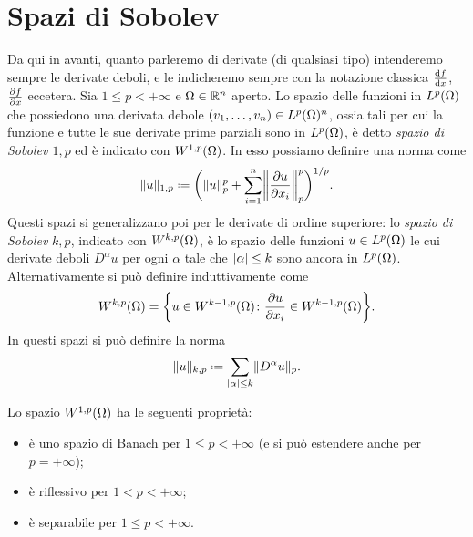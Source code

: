 \section{Spazi di Sobolev}
Da qui in avanti, quanto parleremo di derivate (di qualsiasi tipo) intenderemo sempre le derivate deboli, e le indicheremo sempre con la notazione classica $\drv{f}{x}$, $\drp{f}{x}$ eccetera.
Sia $1\le p<+\infty$ e $\Omega\in\R^n$ aperto.
Lo spazio delle funzioni in $\leb[p]{\Omega}$ che possiedono una derivata debole $(v_1,\dotsc,v_n)\in\leb[p]{\Omega}^n$, ossia tali per cui la funzione e tutte le sue derivate prime parziali sono in $\leb[p]{\Omega}$, è detto \emph{spazio di Sobolev $1,p$} ed è indicato con $\sobW[1,p]{\Omega}$.
In esso possiamo definire una norma come
\begin{equation}
    \norm{u}_{1,p}\defeq\biggl(\norm{u}_p^p+\sum_{i=1}^n\norm[\bigg]{\drp{u}{x_i}}_p^p\biggr)^{1/p}.
    \label{eq:norma-W1p}
\end{equation}
Questi spazi si generalizzano poi per le derivate di ordine superiore: lo \emph{spazio di Sobolev} $k,p$, indicato con $\sobW[k,p]{\Omega}$, è lo spazio delle funzioni $u\in\leb[p]{\Omega}$ le cui derivate deboli $D^\alpha u$ per ogni $\alpha$ tale che $\abs{\alpha}\le k$ sono ancora in $\leb[p]{\Omega}$.
Alternativamente si può definire induttivamente come
\begin{equation}
    \sobW[k,p]{\Omega}=\biggl\{u\in\sobW[k-1,p]{\Omega}\colon \drp{u}{x_i}\in\sobW[k-1,p]{\Omega}\biggr\}.
\end{equation}
In questi spazi si può definire la norma
\begin{equation}
    \norm{u}_{k,p}\defeq\sum_{\abs{\alpha}\le k}\norm{D^\alpha u}_p.
    \label{eq:norma-Wkp}
\end{equation}
\begin{proprieta}
    Lo spazio $\sobW[1,p]{\Omega}$ ha le seguenti proprietà:
    \begin{itemize}
        \item è uno spazio di Banach per $1\le p<+\infty$ (e si può estendere anche per $p=+\infty$);
        \item è riflessivo per $1<p<+\infty$;
        \item è separabile per $1\le p<+\infty$.
    \end{itemize}
\end{proprieta}
